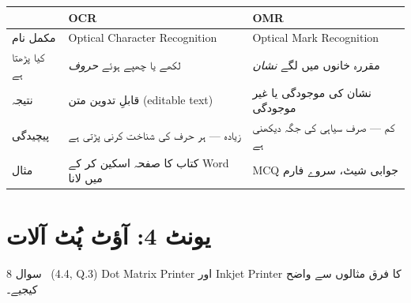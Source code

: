 \begin{hal}
\begin{center}
\begin{tabular}{@{}p{2.6cm} p{5.8cm} p{5.8cm}@{}}
\toprule
 & \textbf{\textenglish{OCR}} & \textbf{\textenglish{OMR}} \\
\midrule
مکمل نام & \textenglish{Optical Character Recognition} & \textenglish{Optical Mark Recognition} \\
کیا پڑھتا ہے & لکھے یا چھپے ہوئے \emph{حروف} & مقررہ خانوں میں لگے \emph{نشان} \\
نتیجہ & قابلِ تدوین متن (\textenglish{editable text}) & نشان کی موجودگی یا غیر موجودگی \\
پیچیدگی & زیادہ --- ہر حرف کی شناخت کرنی پڑتی ہے & کم --- صرف سیاہی کی جگہ دیکھنی ہے \\
مثال & کتاب کا صفحہ اسکین کر کے \textenglish{Word} میں لانا & \textenglish{MCQ} جوابی شیٹ، سروے فارم \\
\bottomrule
\end{tabular}
\end{center}

\end{hal}

\section*{یونٹ \textenglish{4}: آؤٹ پُٹ آلات}

\begin{sawal}{سوال \textenglish{8} \ \textnormal{\small(\textenglish{4.4, Q.3})}}
\textenglish{Dot Matrix Printer} اور \textenglish{Inkjet Printer} کا فرق
مثالوں سے واضح کیجیے۔
\end{sawal}

